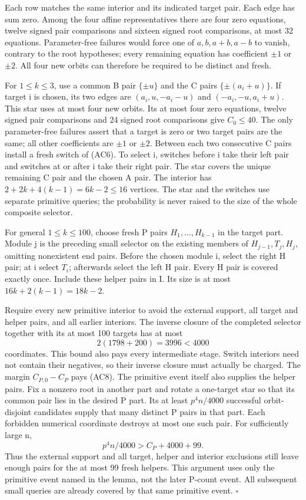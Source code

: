 \documentclass[11pt,a4paper]{article}
\begin{document}
Each row matches the same interior and its indicated target pair. Each edge has sum zero. Among the four affine representatives there are four zero equations, twelve signed pair comparisons and sixteen signed root comparisons, at most 32 equations. Parameter-free failures would force one of \(a,b,a+b,a-b\) to vanish, contrary to the root hypotheses; every remaining equation has coefficient \(\pm1\) or \(\pm2\). All four new orbits can therefore be required to be distinct and fresh.

For \(1\leq k\leq3\), use a common B pair \(\{\pm u\}\) and the C pairs \(\{\pm(a_i+u)\}\). If target i is chosen, its two edges are \((a_i,u,-a_i-u)\) and \((-a_i,-u,a_i+u)\). This star uses at most four new orbits. Its at most four zero equations, twelve signed pair comparisons and 24 signed root comparisons give \(C_0\leq40\). The only parameter-free failures assert that a target is zero or two target pairs are the same; all other coefficients are \(\pm1\) or \(\pm2\). Between each two consecutive C pairs install a fresh switch of (AC6). To select i, switches before i take their left pair and switches at or after i take their right pair. The star covers the unique remaining C pair and the chosen A pair. The interior has \(2+2k+4(k-1)=6k-2\leq16\) vertices. The star and the switches use separate primitive queries; the probability is never raised to the size of the whole composite selector.

For general \(1\leq k\leq100\), choose fresh P pairs \(H_1,\ldots,H_{k-1}\) in the target part. Module j is the preceding small selector on the existing members of \(H_{j-1},T_j,H_j\), omitting nonexistent end pairs. Before the chosen module i, select the right H pair; at i select \(T_i\); afterwards select the left H pair. Every H pair is covered exactly once. Include these helper pairs in I. Its size is at most \(16k+2(k-1)=18k-2\).

Require every new primitive interior to avoid the external support, all target and helper pairs, and all earlier interiors. The inverse closure of the completed selector together with its at most 100 targets has at most \begin{equation}
2(1798+200)=3996<4000
\tag{AC8}\label{eq:AC8}
\end{equation} coordinates. This bound also pays every intermediate stage. Switch interiors need not contain their negatives, so their inverse closure must actually be charged. The margin \(C_{P,0}-C_P\) pays (AC8). The primitive event itself also supplies the helper pairs. Fix a nonzero root in another part and rotate a one-target star so that its common pair lies in the desired P part. Its at least \(p^4n/4000\) successful orbit-disjoint candidates supply that many distinct P pairs in that part. Each forbidden numerical coordinate destroys at most one such pair. For sufficiently large n, \[
p^4n/4000>C_P+4000+99.
\] Thus the external support and all target, helper and interior exclusions still leave enough pairs for the at most 99 fresh helpers. This argument uses only the primitive event named in the lemma, not the later P-count event. All subsequent small queries are already covered by that same primitive event. \(\square\)
\end{document}
